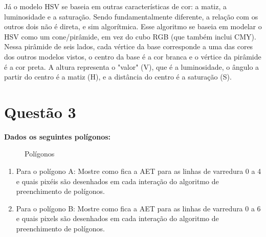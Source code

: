 \documentclass[12pt]{article}
\begin{document}
Já o modelo HSV se baseia em outras características de cor: a matiz, a luminosidade e a saturação. Sendo fundamentalmente diferente, a relação com os outros dois não é direta, e sim algorítmica. Esse algoritmo se baseia em modelar o HSV como um cone/pirâmide, em vez do cubo RGB (que também inclui CMY). Nessa pirâmide de seis lados, cada vértice da base corresponde a uma das cores dos outros modelos vistos, o centro da base é a cor branca e o vértice da pirâmide é a cor preta. A altura representa o "valor" (V), que é a luminosidade, o ângulo a partir do centro é a matiz (H), e a distância do centro é a saturação (S).

\section*{Questão 3}
{\bfseries Dados os seguintes polígonos:

\begin{figure}[H]
    \centering
    \caption{Polígonos}
\end{figure}{}

\begin{enumerate}[label=\alph*)]
    \item Para o polígono A: Mostre como fica a AET para as linhas de varredura 0 a 4 e quais pixéis são desenhados em cada interação do algoritmo de preenchimento de polígonos.
    \item Para o polígono B: Mostre como fica a AET para as linhas de varredura 0 a 6 e quais pixels são desenhados em cada interação do algoritmo de preenchimento de polígonos.
\end{enumerate}
}
\end{document}
